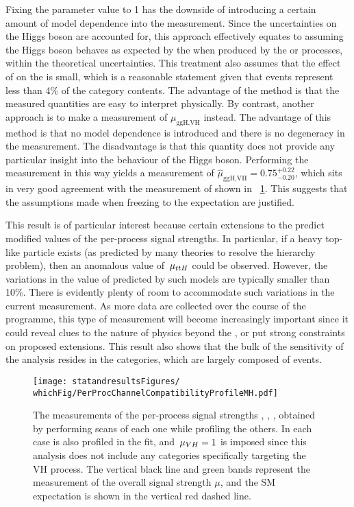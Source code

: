 Fixing the \muVH parameter value to 1 has the downside of introducing a certain amount of model dependence into the measurement. Since the uncertainties on the \SM Higgs boson \crosssection\s are accounted for, this approach effectively equates to assuming the Higgs boson behaves as expected by the \SM when produced by the \WH or \ZH processes, within the theoretical uncertainties. This treatment also assumes that the effect of \VH on the \muggH is small, which is a reasonable statement given that \VH events represent less than 4\% of the \Untagged category contents. The advantage of the method is that the measured quantities are easy to interpret physically. By contrast, another approach is to make a measurement of $\mu_{\textrm{ggH,VH}}$ instead. The advantage of this method is that no model dependence is introduced and there is no degeneracy in the measurement. The disadvantage is that this quantity does not provide any particular insight into the behaviour of the Higgs boson. Performing the measurement in this way yields a measurement of $\hat{\mu}_{\textrm{ggH,VH}}=0.75_{-0.20}^{+0.22}$, which sits in very good agreement with the measurement of \muggH shown in \Fig~\ref{fig:statandresults:mu_per_proc}. This suggests that the assumptions made when freezing \muVH to the \SM expectation are justified. 

This result is of particular interest because certain extensions to the \SM predict modified values of the per-process signal strengths. In particular, if a heavy top-like particle exists (as predicted by many theories to resolve the hierarchy problem), then an anomalous value of $\,\mu_{ttH}$ could be observed. However, the variations in the value of \muttH predicted by such models are typically smaller than 10\%. There is evidently plenty of room to accommodate such variations in the current measurement. As more data are collected over the course of the \LHC programme, this type of measurement will become increasingly important since it could reveal clues to the nature of physics beyond the \SM, or put strong constraints on proposed extensions. This result also shows that the bulk of the sensitivity of the analysis resides in the \Untagged categories, which are largely composed of \ggH events.

\begin{figure}[h!]
\centering
\texttt{[image: statandresultsFigures/\\whichFig/PerProcChannelCompatibilityProfileMH.pdf]} 
\caption{The measurements of the per-process signal strengths \muggH, \muVBF, \muttH, obtained by performing \DNLL scans of each one while profiling the others. In each case \mH is also profiled in the fit, and $\,\mu_{VH}=1$ is imposed since this analysis does not include any categories specifically targeting the VH process. The vertical black line and green bands represent the measurement of the overall signal strength $\mu$, and the SM expectation is shown in the vertical red dashed line.}

\label{fig:statandresults:mu_per_proc}

\end{figure}

